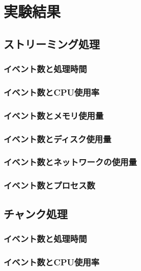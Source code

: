 \documentclass[../../main]{subfiles}
\begin{document}
    \section{実験結果}\label{sec:result}
    
    \subsection{ストリーミング処理}\label{subsec:result-streaming}
    \subsubsection{イベント数と処理時間}\label{subsubsec:result-streaming-time}
    \subsubsection{イベント数とCPU使用率}\label{subsubsec:result-streaming-cpu}
    \subsubsection{イベント数とメモリ使用量}\label{subsubsec:result-streaming-memory}
    \subsubsection{イベント数とディスク使用量}\label{subsubsec:result-streaming-disk}
    \subsubsection{イベント数とネットワークの使用量}\label{subsubsec:result-streaming-network}
    \subsubsection{イベント数とプロセス数}\label{subsubsec:result-streaming-process}

    \subsection{チャンク処理}\label{subsec:result-chunk}
    \subsubsection{イベント数と処理時間}\label{subsubsec:result-chunk-time}
    \subsubsection{イベント数とCPU使用率}\label{subsubsec:result-chunk-cpu}
\end{document}
